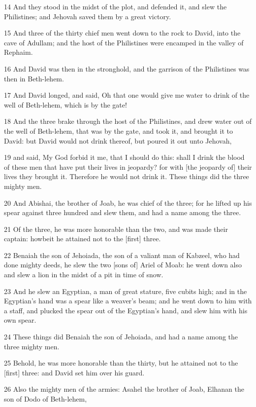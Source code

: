 \par 14 And they stood in the midst of the plot, and defended it, and slew the Philistines; and Jehovah saved them by a great victory.
\par 15 And three of the thirty chief men went down to the rock to David, into the cave of Adullam; and the host of the Philistines were encamped in the valley of Rephaim.
\par 16 And David was then in the stronghold, and the garrison of the Philistines was then in Beth-lehem.
\par 17 And David longed, and said, Oh that one would give me water to drink of the well of Beth-lehem, which is by the gate!
\par 18 And the three brake through the host of the Philistines, and drew water out of the well of Beth-lehem, that was by the gate, and took it, and brought it to David: but David would not drink thereof, but poured it out unto Jehovah,
\par 19 and said, My God forbid it me, that I should do this: shall I drink the blood of these men that have put their lives in jeopardy? for with [the jeopardy of] their lives they brought it. Therefore he would not drink it. These things did the three mighty men.
\par 20 And Abishai, the brother of Joab, he was chief of the three; for he lifted up his spear against three hundred and slew them, and had a name among the three.
\par 21 Of the three, he was more honorable than the two, and was made their captain: howbeit he attained not to the [first] three.
\par 22 Benaiah the son of Jehoiada, the son of a valiant man of Kabzeel, who had done mighty deeds, he slew the two [sons of] Ariel of Moab: he went down also and slew a lion in the midst of a pit in time of snow.
\par 23 And he slew an Egyptian, a man of great stature, five cubits high; and in the Egyptian's hand was a spear like a weaver's beam; and he went down to him with a staff, and plucked the spear out of the Egyptian's hand, and slew him with his own spear.
\par 24 These things did Benaiah the son of Jehoiada, and had a name among the three mighty men.
\par 25 Behold, he was more honorable than the thirty, but he attained not to the [first] three: and David set him over his guard.
\par 26 Also the mighty men of the armies: Asahel the brother of Joab, Elhanan the son of Dodo of Beth-lehem,
